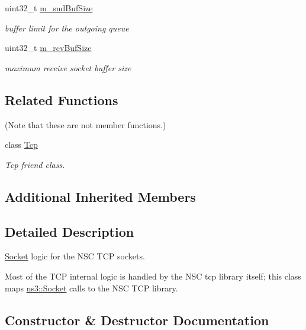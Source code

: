 \begin{DoxyCompactItemize}
uint32\+\_\+t \hyperlink{classns3_1_1NscTcpSocketImpl_a03ad612a2135edbbeb20a683857b569a}{m\+\_\+snd\+Buf\+Size}
\begin{DoxyCompactList}\small\item\em buffer limit for the outgoing queue \end{DoxyCompactList}\item 
uint32\+\_\+t \hyperlink{classns3_1_1NscTcpSocketImpl_a770df3b7830449d1296dd2ed56a5cf3b}{m\+\_\+rcv\+Buf\+Size}
\begin{DoxyCompactList}\small\item\em maximum receive socket buffer size \end{DoxyCompactList}\end{DoxyCompactItemize}
\subsection*{Related Functions}
(Note that these are not member functions.) \begin{DoxyCompactItemize}
\item 
class \hyperlink{classns3_1_1NscTcpSocketImpl_ab70ea99b534c42cce379afba2aa54ce5}{Tcp}
\begin{DoxyCompactList}\small\item\em Tcp friend class. \end{DoxyCompactList}\end{DoxyCompactItemize}
\subsection*{Additional Inherited Members}


\subsection{Detailed Description}
\hyperlink{classns3_1_1Socket}{Socket} logic for the N\+SC T\+CP sockets. 

Most of the T\+CP internal logic is handled by the N\+SC tcp library itself; this class maps \hyperlink{classns3_1_1Socket}{ns3\+::\+Socket} calls to the N\+SC T\+CP library. 

\subsection{Constructor \& Destructor Documentation}
